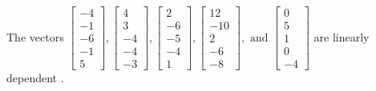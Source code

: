 \begin{exercise}
\begin{exerciseStatement}
  \end{exerciseStatement}
  \begin{exerciseAnswer}
   The vectors \(\left[\begin{array}{r}
-4 \\
-1 \\
-6 \\
-1 \\
5
\end{array}\right] , \left[\begin{array}{r}
4 \\
3 \\
-4 \\
-4 \\
-3
\end{array}\right] , \left[\begin{array}{r}
2 \\
-6 \\
-5 \\
-4 \\
1
\end{array}\right] , \left[\begin{array}{r}
12 \\
-10 \\
2 \\
-6 \\
-8
\end{array}\right] , \text{ and } \left[\begin{array}{r}
0 \\
5 \\
1 \\
0 \\
-4
\end{array}\right]\) are 
  	 linearly dependent  .
  


  \end{exerciseAnswer}
\end{exercise}
